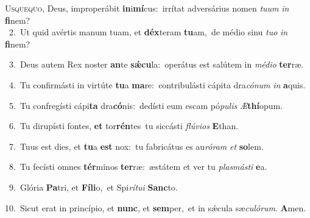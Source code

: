 \lettrine{\initial\textcolor{\initialcolor}{U}}{squequo,} Deus, improperábit \textbf{in}\-i\-\textbf{mí}\-cus:~\star irrítat adversárius nomen \textit{tu}\-\textit{um} \textit{in} \textbf{fi}\-nem?\\
{\numbfont\textcolor{\numbcolor}{~2.}}~Ut quid avértis manum tuam, et \textbf{déx}\-teram \textbf{tu}\-am,~\star de médio sinu \textit{tu}\-\textit{o} \textit{in} \textbf{fi}\-nem?\par
{\numbfont\textcolor{\numbcolor}{~3.}}~Deus autem Rex noster \textbf{an}\-te \textbf{sǽ}\-\textbf{cu}la:~\star operátus est salútem in \textit{mé}\-\textit{di}\textit{o} \textbf{ter}\-ræ.\par
{\numbfont\textcolor{\numbcolor}{~4.}}~Tu confirmásti in virtúte \textbf{tu}\-a \textbf{ma}\-re:~\star contribulásti cápita dra\-\textit{có}\-\textit{num} \textit{in} \textbf{a}\-quis.\par
{\numbfont\textcolor{\numbcolor}{~5.}}~Tu confregísti cápi\textbf{ta} dra\-\textbf{có}\-nis:~\star dedísti eum escam pó\-\textit{pu}\-\textit{lis} \textit{Æ}\-\textbf{thí}opum.\par
{\numbfont\textcolor{\numbcolor}{~6.}}~Tu dirupísti fontes, \textbf{et} tor\-\textbf{rén}\-tes~\star tu siccásti \textit{flú}\-\textit{vi}\textit{os} \textbf{E}\-than.\par
{\numbfont\textcolor{\numbcolor}{~7.}}~Tuus est dies, et \textbf{tu}\-a \textbf{est} nox:~\star tu fabricátus es au\-\textit{ró}\-\textit{ram} \textit{et} \textbf{so}\-lem.\par
{\numbfont\textcolor{\numbcolor}{~8.}}~Tu fecísti omnes \textbf{tér}\-minos \textbf{ter}\-ræ:~\star æstátem et ver tu \textit{plas}\-\textit{más}\textit{ti} \textbf{e}\-a.\par
{\numbfont\textcolor{\numbcolor}{~9.}}~Glória \textbf{Pa}\-tri, et \textbf{Fí}\-\textbf{li}o,~\star et Spi\-\textit{rí}\-\textit{tu}\textit{i} \textbf{Sanc}\-to.\par
{\numbfont\textcolor{\numbcolor}{10.}}~Sicut erat in princípio, et \textbf{nunc}\-, et \textbf{sem}\-per,~\star et in sǽcula sæ\-\textit{cu}\-\textit{ló}\textit{rum}. \textbf{A}\-men.\par
